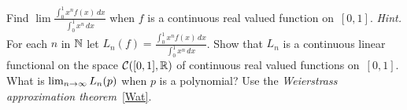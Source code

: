 \begin{prob}  Find $\lim\frac{\int_0^1 x^nf(x)\,dx}{\int_0^1 x^n\,dx}$ when $f$ is a continuous
real valued function on~$[0,1]$. \emph{Hint.}  For each $n$ in $\mathbb{N}$ let $L_n(f) =
\frac{\int_0^1 x^nf(x)\,dx}{\int_0^1 x^n\,dx}$.  Show that $L_n$ is a continuous linear
functional on the space $\mathcal{C}([0,1],\mathbb{R})$ of continuous real valued functions
on~$[0,1]$. What is $\lim_{n \rightarrow \infty} L_n(p)$ when $p$ is a polynomial? Use the
\emph{Weierstrass approximation theorem}~\ref{Wat}.
\end{prob}

\endinput
